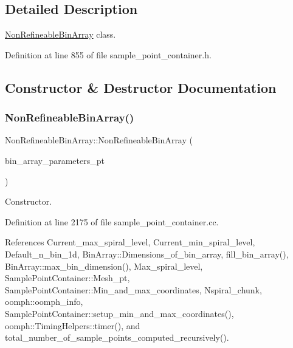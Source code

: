 \subsection{Detailed Description}
\hyperlink{classNonRefineableBinArray}{Non\+Refineable\+Bin\+Array} class. 

Definition at line 855 of file sample\+\_\+point\+\_\+container.\+h.



\subsection{Constructor \& Destructor Documentation}
\mbox{\label{classNonRefineableBinArray_addc6a573733705d5178d1773a9a4a879}} 
\subsubsection{\texorpdfstring{Non\+Refineable\+Bin\+Array()}{NonRefineableBinArray()}\hspace{0.1cm}{\footnotesize\ttfamily [1/2]}}
{\footnotesize\ttfamily Non\+Refineable\+Bin\+Array\+::\+Non\+Refineable\+Bin\+Array (\begin{DoxyParamCaption}\item[{Sample\+Point\+Container\+Parameters $\ast$}]{bin\+\_\+array\+\_\+parameters\+\_\+pt }\end{DoxyParamCaption})}



Constructor. 



Definition at line 2175 of file sample\+\_\+point\+\_\+container.\+cc.



References Current\+\_\+max\+\_\+spiral\+\_\+level, Current\+\_\+min\+\_\+spiral\+\_\+level, Default\+\_\+n\+\_\+bin\+\_\+1d, Bin\+Array\+::\+Dimensions\+\_\+of\+\_\+bin\+\_\+array, fill\+\_\+bin\+\_\+array(), Bin\+Array\+::max\+\_\+bin\+\_\+dimension(), Max\+\_\+spiral\+\_\+level, Sample\+Point\+Container\+::\+Mesh\+\_\+pt, Sample\+Point\+Container\+::\+Min\+\_\+and\+\_\+max\+\_\+coordinates, Nspiral\+\_\+chunk, oomph\+::oomph\+\_\+info, Sample\+Point\+Container\+::setup\+\_\+min\+\_\+and\+\_\+max\+\_\+coordinates(), oomph\+::\+Timing\+Helpers\+::timer(), and total\+\_\+number\+\_\+of\+\_\+sample\+\_\+points\+\_\+computed\+\_\+recursively().

